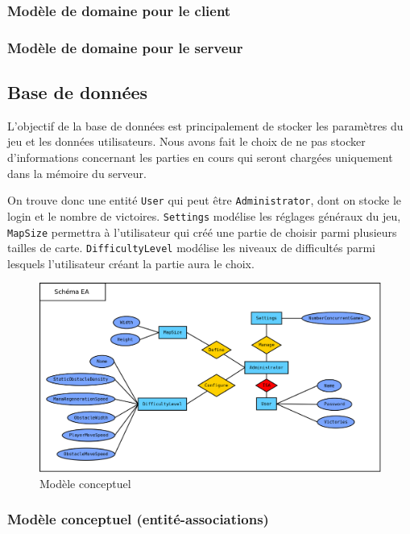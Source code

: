 \documentclass[a4paper,12pt]{article}
\begin{document}
	\subsubsection{Modèle de domaine pour le client}
	\subsubsection{Modèle de domaine pour le serveur}
	
	
	\subsection{Base de données}
	L'objectif de la base de données est principalement de stocker les paramètres du jeu et les données utilisateurs. Nous avons fait le choix de ne pas stocker d'informations concernant les parties en cours qui seront chargées uniquement dans la mémoire du serveur. \par
	
	On trouve donc une entité \texttt{User} qui peut être \texttt{Administrator}, dont on stocke le login et le nombre de victoires. \texttt{Settings} modélise les réglages généraux du jeu, \texttt{MapSize} permettra à l'utilisateur qui créé une partie de choisir parmi plusieurs tailles de carte. \texttt{DifficultyLevel} modélise les niveaux de difficultés parmi lesquels l'utilisateur créant la partie aura le choix.
	
	\begin{figure}[ht]
		\centering
		\includegraphics[width=\textwidth]{../Database/ER_diagram.png}
		\caption{Modèle conceptuel}
		\label{fig:database_er}
	\end{figure}

	\subsubsection{Modèle conceptuel (entité-associations)}
	
\end{document}
